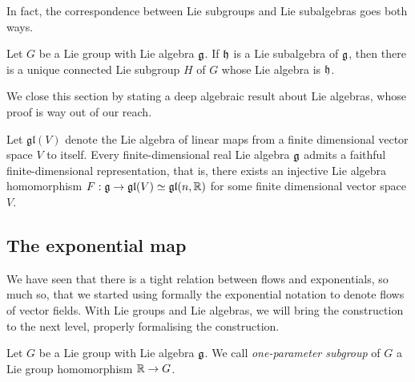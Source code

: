 In fact, the correspondence between Lie subgroups and Lie subalgebras goes both ways.

\begin{theorem}
  Let $G$ be a Lie group with Lie algebra $\mathfrak{g}$. If $\mathfrak{h}$ is a Lie subalgebra of $\mathfrak{g}$, then there is a unique connected Lie subgroup $H$ of $G$ whose Lie algebra is $\mathfrak{h}$.
\end{theorem}

We close this section by stating a deep algebraic result about Lie algebras, whose proof is way out of our reach.
\begin{theorem}
  Let $\mathfrak{gl}(V)$ denote the Lie algebra of linear maps from a finite dimensional vector space $V$ to itself.
  Every finite-dimensional real Lie algebra $\mathfrak{g}$ admits a faithful finite-dimensional representation, that is, there exists an injective Lie algebra homomorphism $F: \mathfrak{g} \to \mathfrak{gl}(V)\simeq\mathfrak{gl}(n,\mathbb{R})$ for some finite dimensional vector space $V$.
\end{theorem}

\subsection{The exponential map}

We have seen that there is a tight relation between flows and exponentials, so much so, that we started using formally the exponential notation to denote flows of vector fields.
With Lie groups and Lie algebras, we will bring the construction to the next level, properly formalising the construction.

\begin{definition}
  Let $G$ be a Lie group with Lie algebra $\mathfrak{g}$.
  We call \emph{one-parameter subgroup} of $G$ a Lie group homomorphism $\mathbb{R}\to G$.
\end{definition}

